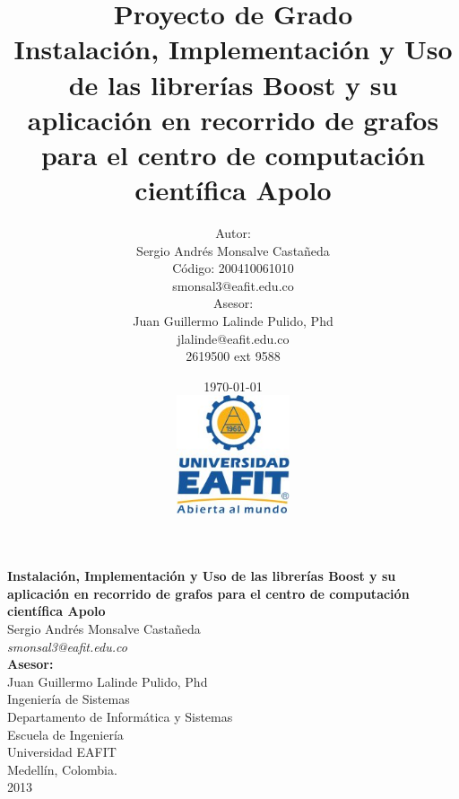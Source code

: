 \documentclass[twoside,letterpaper,12pt]{report}
\title{
	Proyecto de Grado\\[0.5cm]
	Instalación, Implementación y Uso de las librerías Boost y su aplicación en recorrido de grafos para el centro de computación científica Apolo
}
\author{
	Autor:\\[0.3cm]
	Sergio Andrés Monsalve Castañeda\\
	Código: 200410061010\\
	smonsal3@eafit.edu.co\\[0.7cm]
	Asesor: \\[0.3cm]
	Juan Guillermo Lalinde Pulido, Phd\\
	jlalinde@eafit.edu.co\\
	2619500 ext 9588%
}
\date{
	\today \\[0.5cm]
	\includegraphics[width=0.25\textwidth]{aux/logo_eafit} 
}
\begin{document}

\maketitle


\thispagestyle{empty} %
\begin{center}
\textbf{{\Large Instalación, Implementación y Uso de las librerías Boost y su aplicación en recorrido de grafos para el centro de computación científica Apolo}}\\[3cm]
{\Large Sergio Andrés Monsalve Castañeda} \\ {\large \textit{smonsal3@eafit.edu.co}}\\[2.5cm]

{\large \textbf{Asesor:} \\Juan Guillermo Lalinde Pulido, Phd}\\[3cm]

Ingeniería de Sistemas \\ Departamento de Informática y Sistemas  \\ Escuela de Ingeniería \\ Universidad EAFIT \\ Medellín, Colombia.\\
2013

\end{center}
\pagebreak

\end{document}
